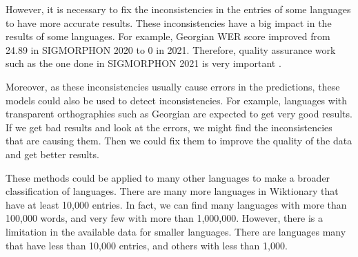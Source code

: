 \documentclass[11pt,a4paper]{article}
\begin{document}
However, it is necessary to fix the inconsistencies in the entries of some languages to have more accurate results. These inconsistencies have a big impact in the results of some languages. For example, Georgian WER score improved from 24.89 in SIGMORPHON 2020 \cite{gorman-etal-2020-sigmorphon} to 0 in 2021. Therefore, quality assurance work such as the one done in SIGMORPHON 2021 is very important \cite{ashby-etal-2021-results}.

Moreover, as these inconsistencies usually cause errors in the predictions, these models could also be used to detect inconsistencies. For example, languages with transparent orthographies such as Georgian are expected to get very good results. If we get bad results and look at the errors, we might find the inconsistencies that are causing them. Then we could fix them to improve the quality of the data and get better results.

These methods could be applied to many other languages to make a broader classification of languages. There are many more languages in Wiktionary that have at least 10,000 entries. In fact, we can find many languages with more than 100,000 words, and very few with more than 1,000,000. However, there is a limitation in the available data for smaller languages. There are languages many that have less than 10,000 entries, and others with less than 1,000.



\end{document}
